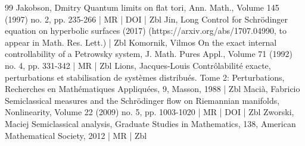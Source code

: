 \documentclass[10pt]{amsart}
\theoremstyle{definition}\newtheorem{defi}[theo]{Definition}\newtheorem{rema}[theo]{Remark}\newtheorem{exam}[theo]{Example}\newtheorem{exem}[theo]{Example}\newtheorem{nota}[theo]{Notation}
\begin{document}
\begin{thebibliography}{99}
Jakobson, Dmitry Quantum limits on flat tori, Ann. Math., Volume 145 (1997) no. 2, pp. 235-266 | MR | DOI | Zbl
Jin, Long Control for Schrödinger equation on hyperbolic surfaces (2017) (https://arxiv.org/abs/1707.04990, to appear in Math. Res. Lett.) | Zbl
Komornik, Vilmos On the exact internal controllability of a Petrowsky system, J. Math. Pures Appl., Volume 71 (1992) no. 4, pp. 331-342 | MR | Zbl
Lions, Jacques-Louis Contrôlabilité exacte, perturbations et stabilisation de systèmes distribués. Tome 2: Perturbations, Recherches en Mathématiques Appliquées, 9, Masson, 1988 | Zbl
Macià, Fabricio Semiclassical measures and the Schrödinger flow on Riemannian manifolds, Nonlinearity, Volume 22 (2009) no. 5, pp. 1003-1020 | MR | DOI | Zbl
Zworski, Maciej Semiclassical analysis, Graduate Studies in Mathematics, 138, American Mathematical Society, 2012 | MR | Zbl
\end{thebibliography}
\end{document}
